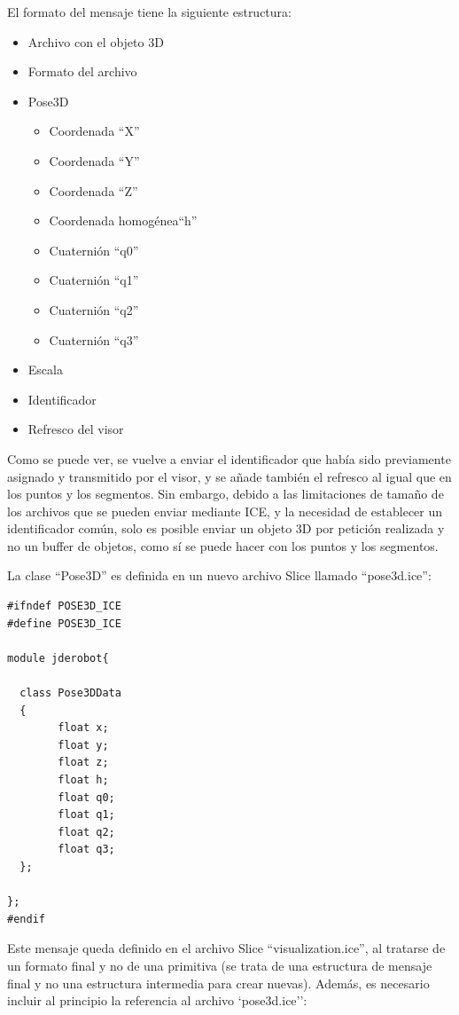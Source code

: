 El formato del mensaje tiene la siguiente estructura:
\begin{itemize}
	\item Archivo con el objeto 3D
	\item Formato del archivo
	\item	Pose3D
	\begin{itemize}
		\item Coordenada ``X''
		\item Coordenada ``Y''
		\item Coordenada ``Z''
		\item Coordenada homogénea``h''
		\item Cuaternión ``q0''
		\item Cuaternión ``q1''
		\item Cuaternión ``q2''
		\item Cuaternión ``q3''
	\end{itemize}
	\item Escala
	\item Identificador
	\item Refresco del visor
\end{itemize}
Como se puede ver, se vuelve a enviar el identificador que había sido previamente asignado y transmitido por el visor, y se añade también el refresco al igual que en los puntos y los segmentos. Sin embargo, debido a las limitaciones de tamaño de los archivos que se pueden enviar mediante ICE, y la necesidad de establecer un identificador común, solo es posible enviar un objeto 3D por petición realizada y no un buffer de objetos, como sí se puede hacer con los puntos y los segmentos.

La clase ``Pose3D'' es definida en un nuevo archivo Slice llamado ``pose3d.ice'':

\begin{lstlisting}[caption= Definición de la clase Pose3D con Slice, label=cod.pose3dslice]
#ifndef POSE3D_ICE
#define POSE3D_ICE

module jderobot{

  class Pose3DData
  {
		float x;
		float y;
		float z;
  		float h;
		float q0;
		float q1;
		float q2;
		float q3;
  };

}; 
#endif
\end{lstlisting}

Este mensaje queda definido en el archivo Slice ``visualization.ice'', al tratarse de un formato final y no de una primitiva (se trata de una estructura de mensaje final y no una estructura intermedia para crear nuevas). Además, es necesario incluir al principio la referencia al archivo `pose3d.ice'':

